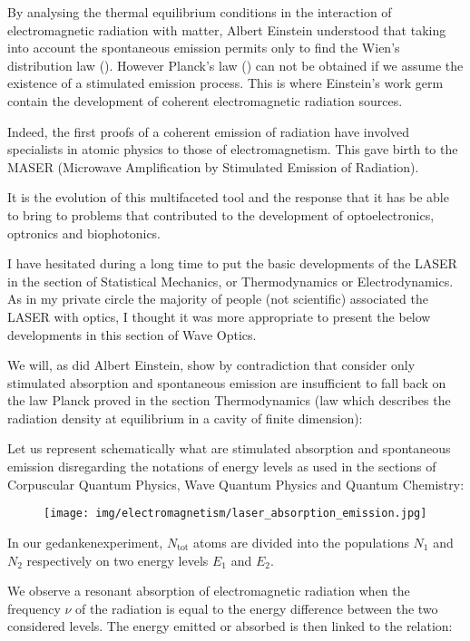 	By analysing the thermal equilibrium conditions in the interaction of electromagnetic radiation with matter, Albert Einstein understood that taking into account the spontaneous emission permits only to find the Wien's distribution law (). However Planck's law () can not be obtained if we assume the existence of a stimulated emission process. This is where Einstein's work germ contain the development of coherent electromagnetic radiation sources.

	Indeed, the first proofs of a coherent emission of radiation have involved specialists in atomic physics to those of electromagnetism. This gave birth to the MASER (Microwave Amplification by Stimulated Emission of Radiation).

	It is the evolution of this multifaceted tool and the response that it has be able to bring to problems that contributed to the development of optoelectronics, optronics and biophotonics.
	
	I have hesitated during a long time to put the basic developments of the LASER in the section of Statistical Mechanics, or Thermodynamics or Electrodynamics. As in my private circle the majority of people (not scientific) associated the LASER with optics, I thought it was more appropriate to present the below developments in this section of Wave Optics.
	
	We will, as did Albert Einstein, show by contradiction that consider only stimulated absorption and spontaneous emission are insufficient to fall back on the law Planck proved in the section Thermodynamics (law which describes the radiation density at equilibrium in a cavity of finite dimension):
	
	Let us represent schematically what are stimulated absorption and spontaneous emission disregarding the notations of energy levels as used in the sections of Corpuscular Quantum Physics, Wave Quantum Physics and Quantum Chemistry:
	\begin{figure}[H]
		\centering
		\texttt{[image: img/electromagnetism/laser\_absorption\_emission.jpg]}
	\end{figure}
	In our gedankenexperiment, $N_\text{tot}$ atoms are divided into the populations $N_1$ and $N_2$ respectively on two energy levels $E_1$ and $E_2$.

	We observe a resonant absorption of electromagnetic radiation when the frequency $\nu$ of the radiation is equal to the energy difference between the two considered levels. The energy emitted or absorbed is then linked to the relation:
	
